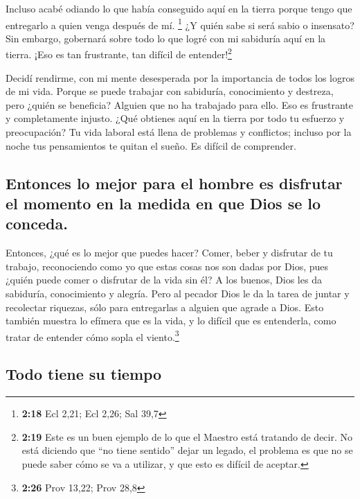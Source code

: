  Incluso acabé odiando lo que había conseguido aquí en la
tierra porque tengo que entregarlo a quien venga después de mí.
\footnote{\textbf{2:18} Ecl 2,21; Ecl 2,26; Sal 39,7}  ¿Y
quién sabe si será sabio o insensato? Sin embargo, gobernará sobre todo
lo que logré con mi sabiduría aquí en la tierra. ¡Eso es tan frustrante,
tan difícil de entender!\footnote{\textbf{2:19} Este es un buen ejemplo
  de lo que el Maestro está tratando de decir. No está diciendo que ``no
  tiene sentido'' dejar un legado, el problema es que no se puede saber
  cómo se va a utilizar, y que esto es difícil de aceptar.}

 Decidí rendirme, con mi mente desesperada por la
importancia de todos los logros de mi vida.  Porque se
puede trabajar con sabiduría, conocimiento y destreza, pero ¿quién se
beneficia? Alguien que no ha trabajado para ello. Eso es frustrante y
completamente injusto.  ¿Qué obtienes aquí en la tierra
por todo tu esfuerzo y preocupación?  Tu vida laboral
está llena de problemas y conflictos; incluso por la noche tus
pensamientos te quitan el sueño. Es difícil de comprender.

\hypertarget{entonces-lo-mejor-para-el-hombre-es-disfrutar-el-momento-en-la-medida-en-que-dios-se-lo-conceda.}{%
\subsection{Entonces lo mejor para el hombre es disfrutar el momento en
la medida en que Dios se lo
conceda.}\label{entonces-lo-mejor-para-el-hombre-es-disfrutar-el-momento-en-la-medida-en-que-dios-se-lo-conceda.}}

 Entonces, ¿qué es lo mejor que puedes hacer? Comer,
beber y disfrutar de tu trabajo, reconociendo como yo que estas cosas
nos son dadas por Dios,  pues ¿quién puede comer o
disfrutar de la vida sin él?  A los buenos, Dios les da
sabiduría, conocimiento y alegría. Pero al pecador Dios le da la tarea
de juntar y recolectar riquezas, sólo para entregarlas a alguien que
agrade a Dios. Esto también muestra lo efímera que es la vida, y lo
difícil que es entenderla, como tratar de entender cómo sopla el
viento.\footnote{\textbf{2:26} Prov 13,22; Prov 28,8}

\hypertarget{todo-tiene-su-tiempo}{%
\subsection{Todo tiene su tiempo}\label{todo-tiene-su-tiempo}}


